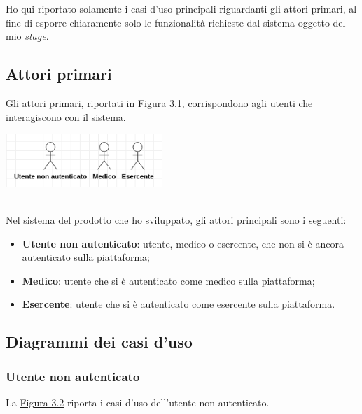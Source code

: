 Ho qui riportato solamente i casi d'uso principali riguardanti gli attori primari, al fine di esporre chiaramente solo le funzionalità richieste dal sistema oggetto del mio \textit{stage}.

\subsection*{Attori primari}

Gli attori primari, riportati in \hyperref[img:attori]{Figura 3.1}, corrispondono agli utenti che interagiscono con il sistema.

\begin{minipage}{\linewidth}
  \label{img:attori}
  \centering
    \includegraphics[height=2cm]{immagini/uc/attori}
\end{minipage} \\

Nel sistema del prodotto che ho sviluppato, gli attori principali sono i seguenti:
\begin{itemize}
  \item \textbf{Utente non autenticato}: utente, medico o esercente, che non si è ancora autenticato sulla piattaforma;
  \item \textbf{Medico}: utente che si è autenticato come medico sulla piattaforma;
  \item \textbf{Esercente}: utente che si è autenticato come esercente sulla piattaforma.
\end{itemize}

\subsection*{Diagrammi dei casi d'uso}

\subsubsection*{Utente non autenticato}

La \hyperref[img:nonautenticato]{Figura 3.2} riporta i casi d'uso dell'utente non autenticato.

